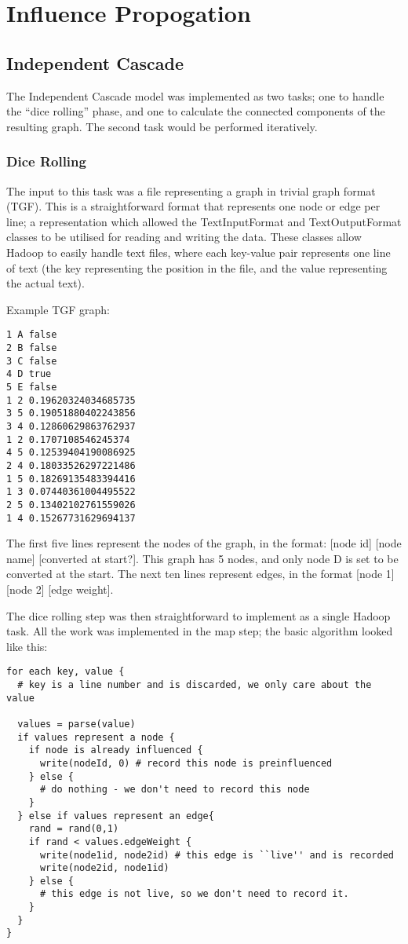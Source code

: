\section{Influence Propogation}

\subsection{Independent Cascade}

The Independent Cascade model was implemented as two tasks; one to handle the ``dice rolling'' phase, and one to calculate the connected components of the resulting graph. The second task would be performed iteratively.

\subsubsection{Dice Rolling}

The input to this task was a file representing a graph in trivial graph format (TGF). This is a straightforward format that represents one node or edge per line; a representation which allowed the TextInputFormat and TextOutputFormat classes to be utilised for reading and writing the data. These classes allow Hadoop to easily handle text files, where each key-value pair represents one line of text (the key representing the position in the file, and the value representing the actual text).

Example TGF graph:

\begin{verbatim}
1 A false
2 B false
3 C false
4 D true
5 E false
1 2 0.19620324034685735
3 5 0.19051880402243856
3 4 0.12860629863762937
1 2 0.1707108546245374
4 5 0.12539404190086925
2 4 0.18033526297221486
1 5 0.18269135483394416
1 3 0.07440361004495522
2 5 0.13402102761559026
1 4 0.15267731629694137
\end{verbatim}

The first five lines represent the nodes of the graph, in the format: [node id] [node name] [converted at start?]. This graph has 5 nodes, and only node D is set to be converted at the start. The next ten lines represent edges, in the format [node 1] [node 2] [edge weight].

The dice rolling step was then straightforward to implement as a single Hadoop task. All the work was implemented in the map step; the basic algorithm looked like this:

\begin{verbatim}
for each key, value {
  # key is a line number and is discarded, we only care about the value

  values = parse(value)
  if values represent a node {
    if node is already influenced {
      write(nodeId, 0) # record this node is preinfluenced
    } else {
      # do nothing - we don't need to record this node
    }
  } else if values represent an edge{
    rand = rand(0,1)
    if rand < values.edgeWeight {
      write(node1id, node2id) # this edge is ``live'' and is recorded
      write(node2id, node1id)
    } else {
      # this edge is not live, so we don't need to record it.
    }
  }
}
\end{verbatim}

